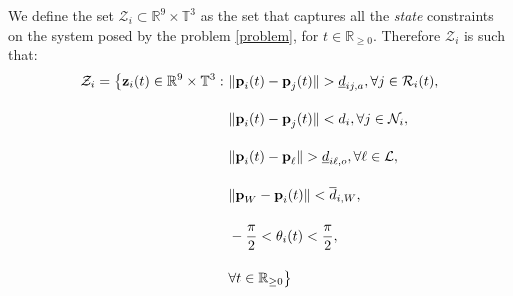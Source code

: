 We define the set $\mathcal{Z}_i \subset \mathbb{R}^{9} \times \mathbb{T}^3$
as the set that captures all the \textit{state} constraints on the system
posed by the problem \eqref{problem}, for $t \in \mathbb{R}_{\geq 0}$.
Therefore $\mathcal{Z}_i$ is such that:
\begin{align}
  \mathcal{Z}_i = \big\{\bm{\mathbf{z}}_i(t) \in \mathbb{R}^{9}\times \mathbb{T}^3 : \
      & \|\bm{\mathbf{p}}_i(t) - \bm{\mathbf{p}}_j(t)\| > \underline{d}_{ij,a}, \forall j \in \mathcal{R}_i(t), \label{constraint:p_1}\\[2.5ex]
      & \|\bm{\mathbf{p}}_i(t) - \bm{\mathbf{p}}_j(t)\| < d_i, \forall j \in \mathcal{N}_i, \\[2.5ex]
      & \|\bm{\mathbf{p}}_i(t) - \bm{\mathbf{p}}_{\ell}\| > \underline{d}_{i\ell,o}, \forall \ell \in \mathcal{L}, \\[2.5ex]
      & \|\bm{\mathbf{p}}_W - \bm{\mathbf{p}}_i(t)\| < \overline{d}_{i,W}, \\[2.5ex]
      & - \frac{\pi}{2} < \theta_i(t) < \frac{\pi}{2} \label{constraint:p_5}, \\[2.5ex]
      &\forall t \in \mathbb{R}_{\geq 0}\big\}
\end{align}
